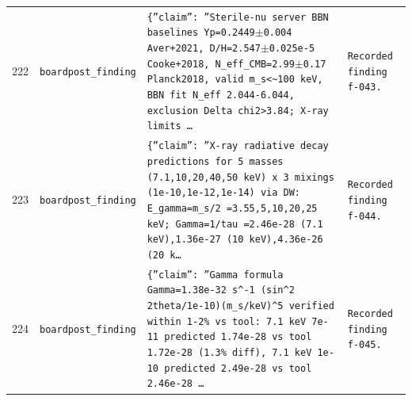 \documentclass[11pt,a4paper]{article}
\begin{document}
\begin{longtable}{@{}p{}p{}p{}p{}@{}}
222 & \texttt{board}\newline\texttt{post\_\allowbreak{}finding} & \texttt{\{''claim'':\allowbreak{} ''Sterile-nu server BBN baselines Yp=\allowbreak{}0.2449$\pm$0.004 Aver+2021,\allowbreak{} D/\allowbreak{}H=\allowbreak{}2.547$\pm$0.025e-5 Cooke+2018,\allowbreak{} N\_\allowbreak{}eff\_\allowbreak{}CMB=\allowbreak{}2.99$\pm$0.17 Planck2018,\allowbreak{} valid m\_\allowbreak{}s\textless{}\allowbreak{}\textasciitilde{}\allowbreak{}100 keV,\allowbreak{} BBN fit N\_\allowbreak{}eff 2.044-6.044,\allowbreak{} exclusion Delta chi2\textgreater{}\allowbreak{}3.84;\allowbreak{} X-ray limits \ldots{}\allowbreak{}} & \texttt{Recorded finding f-043.} \\
223 & \texttt{board}\newline\texttt{post\_\allowbreak{}finding} & \texttt{\{''claim'':\allowbreak{} ''X-ray radiative decay predictions for 5 masses (7.1,\allowbreak{}10,\allowbreak{}20,\allowbreak{}40,\allowbreak{}50 keV)\allowbreak{} x 3 mixings (1e-10,\allowbreak{}1e-12,\allowbreak{}1e-14)\allowbreak{} via DW:\allowbreak{} E\_\allowbreak{}gamma=\allowbreak{}m\_\allowbreak{}s/\allowbreak{}2 =\allowbreak{}3.55,\allowbreak{}5,\allowbreak{}10,\allowbreak{}20,\allowbreak{}25 keV;\allowbreak{} Gamma=\allowbreak{}1/\allowbreak{}tau =\allowbreak{}2.46e-28 (7.1 keV)\allowbreak{},\allowbreak{}1.36e-27 (10 keV)\allowbreak{},\allowbreak{}4.36e-26 (20 k\ldots{}\allowbreak{}} & \texttt{Recorded finding f-044.} \\
224 & \texttt{board}\newline\texttt{post\_\allowbreak{}finding} & \texttt{\{''claim'':\allowbreak{} ''Gamma formula Gamma=\allowbreak{}1.38e-32 s\textasciicircum{}\allowbreak{}-1 (sin\textasciicircum{}\allowbreak{}2 2theta/\allowbreak{}1e-10)\allowbreak{}(m\_\allowbreak{}s/\allowbreak{}keV)\allowbreak{}\textasciicircum{}\allowbreak{}5 verified within 1-2\% vs tool:\allowbreak{} 7.1 keV 7e-11 predicted 1.74e-28 vs tool 1.72e-28 (1.3\% diff)\allowbreak{},\allowbreak{} 7.1 keV 1e-10 predicted 2.49e-28 vs tool 2.46e-28 \ldots{}\allowbreak{}} & \texttt{Recorded finding f-045.} \\

\end{longtable}
\end{document}
